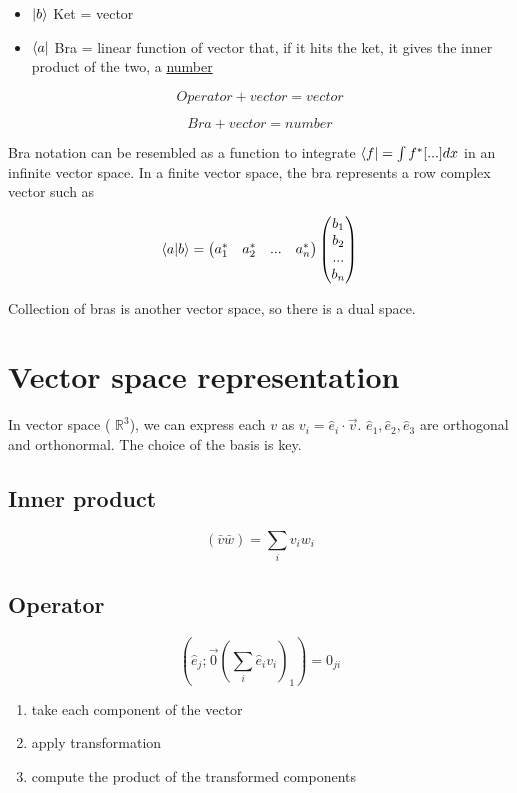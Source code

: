 \begin{multicols}{2}
    \begin{itemize}
        \item $\ket{b}$ Ket = vector
        \item $\bra{a}$ Bra = linear function of vector that, if it hits the ket, it gives the inner product of the two, a \underline{number}
    \end{itemize}
\end{multicols}

$$Operator + vector = vector$$

$$Bra + vector = number$$

Bra notation can be resembled as a function to integrate $\bra{f}=\int f^*[...]dx$ in an infinite vector space. In a finite vector space, the bra represents a row complex vector such as

$$\braket{a}{b}=\begin{pmatrix}a^*_1&a^*_2&...&a^*_n\end{pmatrix}\begin{pmatrix}b_1\\b_2\\...\\b_n\end{pmatrix}$$

Collection of bras is another vector space, so there is a dual space.

\section{Vector space representation}
In vector space ( $\mathbb{R}^3$), we can express each $v$ as $v_i=\hat{e}_i \cdot \vec{v}$. $\hat{e}_1,\hat{e}_2,\hat{e}_3$ are orthogonal and orthonormal. The choice of the basis is key.

    \subsection{Inner product}

    $$(\bar{v}\bar{w})=\sum_{i} v_i w_i$$

    \subsection{Operator}

    $$(\hat{e}_{j} ; \vec{0}(\sum_{i} \hat{e}_{i} v_{i})_{1})=0_{j i}$$

    \begin{multicols}{2}
    \begin{enumerate}
            \item take each component of the vector
            \item apply transformation
            \item compute the product of the transformed components
        \end{enumerate}
    \end{multicols}

